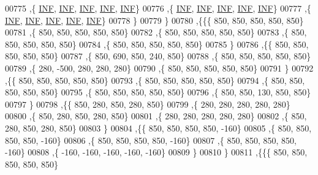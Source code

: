 \begin{DoxyCode}
00775    ,\{   \mbox{\hyperlink{1_88_84__epars_8h_a12c2040f25d8e3a7b9e1c2024c618cb6}{INF}},   \mbox{\hyperlink{1_88_84__epars_8h_a12c2040f25d8e3a7b9e1c2024c618cb6}{INF}},   \mbox{\hyperlink{1_88_84__epars_8h_a12c2040f25d8e3a7b9e1c2024c618cb6}{INF}},   \mbox{\hyperlink{1_88_84__epars_8h_a12c2040f25d8e3a7b9e1c2024c618cb6}{INF}},   \mbox{\hyperlink{1_88_84__epars_8h_a12c2040f25d8e3a7b9e1c2024c618cb6}{INF}}\}
00776    ,\{   \mbox{\hyperlink{1_88_84__epars_8h_a12c2040f25d8e3a7b9e1c2024c618cb6}{INF}},   \mbox{\hyperlink{1_88_84__epars_8h_a12c2040f25d8e3a7b9e1c2024c618cb6}{INF}},   \mbox{\hyperlink{1_88_84__epars_8h_a12c2040f25d8e3a7b9e1c2024c618cb6}{INF}},   \mbox{\hyperlink{1_88_84__epars_8h_a12c2040f25d8e3a7b9e1c2024c618cb6}{INF}},   \mbox{\hyperlink{1_88_84__epars_8h_a12c2040f25d8e3a7b9e1c2024c618cb6}{INF}}\}
00777    ,\{   \mbox{\hyperlink{1_88_84__epars_8h_a12c2040f25d8e3a7b9e1c2024c618cb6}{INF}},   \mbox{\hyperlink{1_88_84__epars_8h_a12c2040f25d8e3a7b9e1c2024c618cb6}{INF}},   \mbox{\hyperlink{1_88_84__epars_8h_a12c2040f25d8e3a7b9e1c2024c618cb6}{INF}},   \mbox{\hyperlink{1_88_84__epars_8h_a12c2040f25d8e3a7b9e1c2024c618cb6}{INF}},   \mbox{\hyperlink{1_88_84__epars_8h_a12c2040f25d8e3a7b9e1c2024c618cb6}{INF}}\}
00778    \}
00779   \}
00780  ,\{\{\{   850,   850,   850,   850,   850\}
00781    ,\{   850,   850,   850,   850,   850\}
00782    ,\{   850,   850,   850,   850,   850\}
00783    ,\{   850,   850,   850,   850,   850\}
00784    ,\{   850,   850,   850,   850,   850\}
00785    \}
00786   ,\{\{   850,   850,   850,   850,   850\}
00787    ,\{   850,   690,   850,   240,   850\}
00788    ,\{   850,   850,   850,   850,   850\}
00789    ,\{   280,  -500,   280,   280,   280\}
00790    ,\{   850,   850,   850,   850,   850\}
00791    \}
00792   ,\{\{   850,   850,   850,   850,   850\}
00793    ,\{   850,   850,   850,   850,   850\}
00794    ,\{   850,   850,   850,   850,   850\}
00795    ,\{   850,   850,   850,   850,   850\}
00796    ,\{   850,   850,   130,   850,   850\}
00797    \}
00798   ,\{\{   850,   280,   850,   280,   850\}
00799    ,\{   280,   280,   280,   280,   280\}
00800    ,\{   850,   280,   850,   280,   850\}
00801    ,\{   280,   280,   280,   280,   280\}
00802    ,\{   850,   280,   850,   280,   850\}
00803    \}
00804   ,\{\{   850,   850,   850,   850,  -160\}
00805    ,\{   850,   850,   850,   850,  -160\}
00806    ,\{   850,   850,   850,   850,  -160\}
00807    ,\{   850,   850,   850,   850,  -160\}
00808    ,\{  -160,  -160,  -160,  -160,  -160\}
00809    \}
00810   \}
00811  ,\{\{\{   850,   850,   850,   850,   850\}

\end{DoxyCode}
